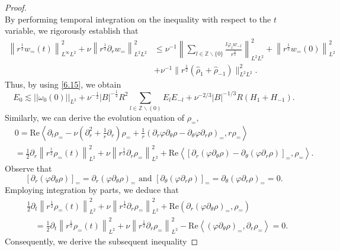 \documentclass[final, 12pt,reqno]{amsart}
\numberwithin{equation}{section}
\begin{document}
\begin{proof}
$$$$
By performing temporal integration on the inequality with respect to the $t$ variable, we rigorously establish that
$$
\begin{aligned}
\left\|r^{\frac{1}{2}} w_=(t)\right\|_{L^\infty L^2}^2+\nu \left\|r^{\frac{1}{2}} \partial_r w_=\right\|_{L^2L^2}^2  &\leq \nu^{-1}\left\|\sum_{l \in \mathbb{Z} \backslash\{0\}} \frac{l \varphi_l w_{-l}}{r^{\frac{3}{2}}}\right\|_{L^2 L^2}^2 +\left\|r^{\frac{1}{2}} w_=(0)\right\|_{L^2}^2\\
&+ \nu^{-1}\|r^{\frac{1}{2}}(\hat{\rho}_{1}+\hat{\rho}_{-1})\|_{L^2L^2}^2.
\end{aligned}
$$
Thus, by using \eqref{6.15}, we obtain
    $$E_0\lesssim ||\omega_0(0)||_{L^2}+\nu^{-\frac{1}{2}}|B|^{-\frac{1}{2}}R^2\sum_{l \in \mathbb{Z} \backslash(0)}E_lE_{-l}+\nu^{-2/3}|B|^{-1/3}R(H_{1}+H_{-1}).$$
Similarly, we can derive the evolution equation of $\rho_=,$
$$
\begin{aligned}
&0=\text{Re}\left\langle\partial_t \rho_=-\nu\left(\partial_r^2+\frac{1}{r} \partial_r\right) \rho_=+\frac{1}{r}\left(\partial_r \varphi \partial_\theta \rho-\partial_\theta \varphi \partial_r \rho\right)_=, r \rho_=\right\rangle \\
& =\frac{1}{2} \partial_r\left\|r^{\frac{1}{2}} \rho_=(t)\right\|_{L^2}^2+\nu\left\|r^{\frac{1}{2}} \partial_r \rho_=\right\|_{L^2}^2+\text{Re}\left\langle\left[\partial_r\left(\varphi \partial_\theta \rho\right)-\partial_\theta\left(\varphi \partial_r \rho\right)\right]_=, \rho_=\right\rangle.
\end{aligned}
$$
Observe that
$$
\left[\partial_r\left(\varphi \partial_\theta \rho\right)\right]_==\partial_r\left(\varphi \partial_\theta \rho\right)_=\text { and }\left[\partial_\theta\left(\varphi \partial_r \rho\right)\right]_==\partial_\theta\left(\varphi \partial_r \rho\right)_==0 .
$$
Employing integration by parts, we deduce that
$$
\begin{aligned}
& \frac{1}{2} \partial_t\left\|r^{\frac{1}{2}} \rho_=(t)\right\|_{L^2}^2+\nu\left\|r^{\frac{1}{2}} \partial_r \rho_=\right\|_{L^2}^2+\text{Re}\left(\partial_r\left(\varphi \partial_\theta \rho\right)_=, \rho_=\right) \\
& \quad=\frac{1}{2} \partial_t\left\|r^{\frac{1}{2}} \rho_=(t)\right\|_{L^2}^2+\nu\left\|r^{\frac{1}{2}} \partial_r \rho_=\right\|_{L^2}^2-\text{Re}\left\langle\left(\varphi \partial_\theta \rho\right)_=, \partial_r \rho_=\right\rangle=0.
\end{aligned}
$$
Consequently, we derive the subsequent inequality

\end{proof}
\end{document}
